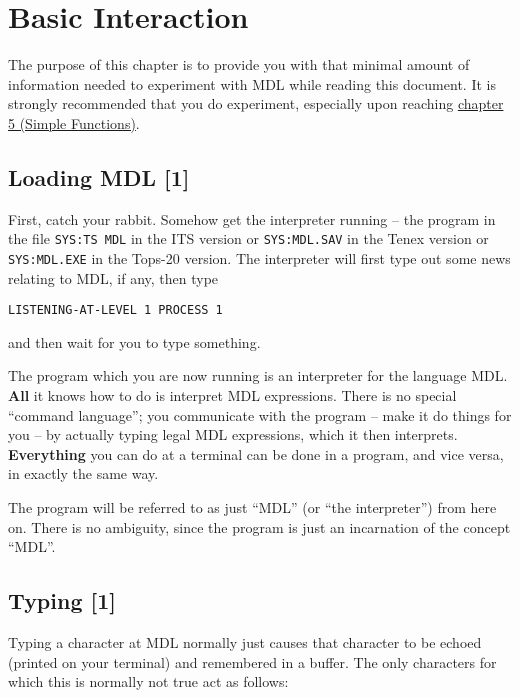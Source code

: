 \documentclass[a4paper]{scrbook}
\begin{document}
\chapter{Basic Interaction}\label{chapter-1.-basic-interaction}

The purpose of this chapter is to provide you with that minimal amount of information needed to experiment with MDL while
reading this document. It is strongly recommended that you do experiment, especially upon reaching
\href{05-simple-functions.md}{chapter 5 (Simple Functions)}.

\section{Loading MDL {[}1{]}}\label{loading-mdl-1}

First, catch your rabbit. Somehow get the interpreter running -- the program in the file \texttt{SYS:TS\ MDL} in the ITS
version or \texttt{SYS:MDL.SAV} in the Tenex version or \texttt{SYS:MDL.EXE} in the Tops-20 version. The interpreter will
first type out some news relating to MDL, if any, then type

\begin{verbatim}
LISTENING-AT-LEVEL 1 PROCESS 1
\end{verbatim}

and then wait for you to type something.

The program which you are now running is an interpreter for the language MDL. \textbf{All} it knows how to do is interpret
MDL expressions. There is no special ``command language''; you communicate with the program -- make it do things for you --
by actually typing legal MDL expressions, which it then interprets. \textbf{Everything} you can do at a terminal can be
done in a program, and vice versa, in exactly the same way.

The program will be referred to as just ``MDL'' (or ``the interpreter'') from here on. There is no ambiguity, since the
program is just an incarnation of the concept ``MDL''.

\section{Typing {[}1{]}}\label{typing-1}

Typing a character at MDL normally just causes that character to be echoed (printed on your terminal) and remembered in a
buffer. The only characters for which this is normally not true act as follows:
\end{document}
